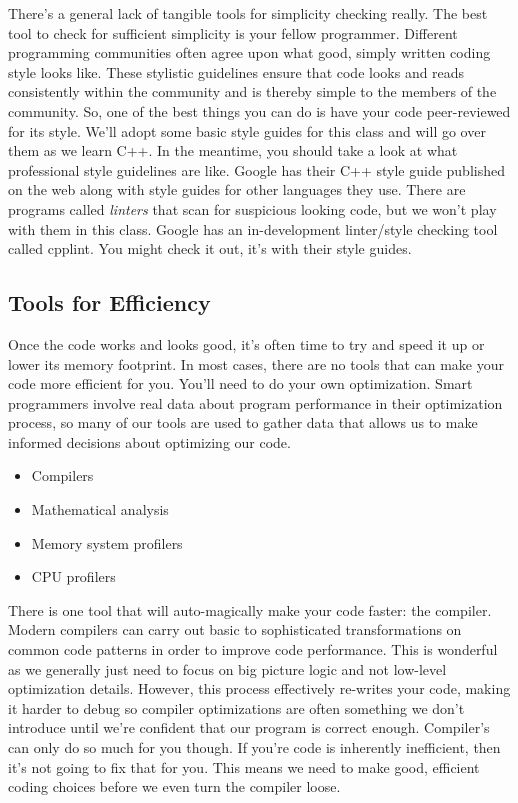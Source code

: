 \documentclass[]{tufte-handout}
\begin{document}
There's a general lack of tangible tools for simplicity checking really. The best tool to check for sufficient simplicity is your fellow programmer.  Different programming communities often agree upon what good, simply written coding style looks like.  These stylistic guidelines ensure that code looks and reads consistently within the community and is thereby simple to the members of the community. So, one of the best things you can do is have your code peer-reviewed for its style. We'll adopt some basic style guides for this class and will go over them as we learn C++. In the meantime, you should take a look at what professional style guidelines are like. Google has their C++ style guide published on the web along with style guides for other languages they use. There are programs called \textit{linters} that scan for suspicious looking code, but we won't play with them in this class. Google has an in-development linter/style checking tool called cpplint.  You might check it out, it's with their style guides.


\subsection{Tools for Efficiency}

Once the code works and looks good, it's often time to try and speed it up or lower its memory footprint. In most cases, there are no tools that can make your code more efficient for you. You'll need to do your own optimization. Smart programmers involve real data about program performance in their optimization process, so many of our tools are used to gather data that allows us to make informed decisions about optimizing our code.
\begin{itemize}
\item Compilers
\item Mathematical analysis
\item Memory system profilers
\item CPU profilers
\end{itemize}

There is one tool that will auto-magically make your code faster: the compiler.  Modern compilers can carry out basic to sophisticated transformations on common code patterns in order to improve code performance.  This is wonderful as we generally just need to focus on big picture logic and not low-level optimization details. However, this process effectively re-writes your code, making it harder to debug so compiler optimizations are often something we don't introduce until we're confident that our program is correct enough.  Compiler's can only do so much for you though. If you're code is inherently inefficient, then it's not going to fix that for you.  This means we need to make good, efficient coding choices before we even turn the compiler loose.   
\end{document}
